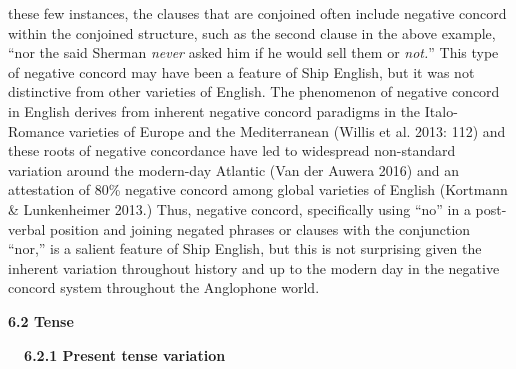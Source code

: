 \begin{styleStandard}
these few instances, the clauses that are conjoined often include negative concord within the conjoined structure, such as the second clause in the above example, “nor the said Sherman \textit{never }asked him if he would sell them or \textit{not.}” This type of negative concord may have been a feature of Ship English, but it was not distinctive from other varieties of English. The phenomenon of negative concord in English derives from inherent negative concord paradigms in the Italo-Romance varieties of Europe and the Mediterranean (Willis et al. 2013: 112) and these roots of negative concordance have led to widespread non-standard variation around the modern-day Atlantic (Van der Auwera 2016) and an attestation of 80\% negative concord among global varieties of English (Kortmann \& Lunkenheimer 2013.) Thus, negative concord, specifically using “no” in a post-verbal position and joining negated phrases or clauses with the conjunction “nor,” is a salient feature of Ship English, but this is not surprising given the inherent variation throughout history and up to the modern day in the negative concord system throughout the Anglophone world. \ 
\end{styleStandard}

\begin{styleStandard}
\textbf{6.2 Tense}
\end{styleStandard}

\begin{styleStandard}
\textbf{\ \ 6.2.1 Present tense variation }
\end{styleStandard}

